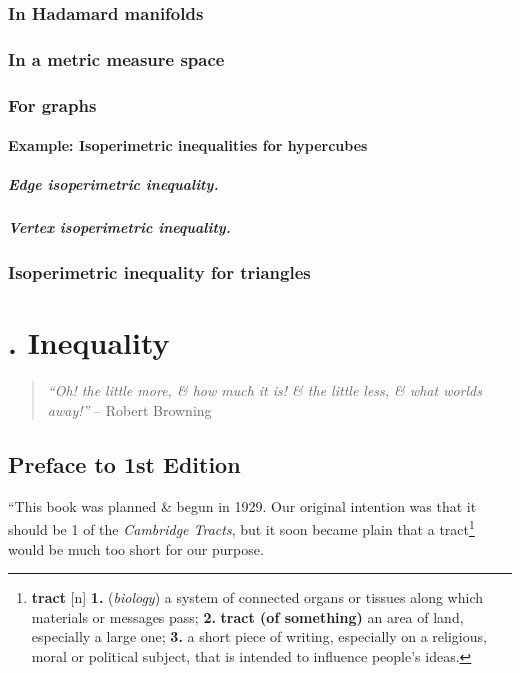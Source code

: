 \documentclass[oneside]{book}
\numberwithin{equation}{section}
\begin{document}
\subsection{In Hadamard manifolds}

\subsection{In a metric measure space}

\subsection{For graphs}

\subsubsection{Example: Isoperimetric inequalities for hypercubes}

\paragraph{Edge isoperimetric inequality.}

\paragraph{Vertex isoperimetric inequality.}

\subsection{Isoperimetric inequality for triangles}


\chapter{\cite{Hardy_Littlewood_Polya1952}. Inequality}

\begin{quotation}
	\textit{``Oh! the little more, \& how much it is! \& the little less, \& what worlds away!''} -- Robert Browning
\end{quotation}

\section*{Preface to 1st Edition}
``This book was planned \& begun in 1929. Our original intention was that it should be 1 of the \textit{Cambridge Tracts}, but it soon became plain that a tract\footnote{\textbf{tract} [n] \textbf{1.} (\textit{biology}) a system of connected organs or tissues along which materials or messages pass; \textbf{2.} \textbf{tract (of something)} an area of land, especially a large one; \textbf{3.} a short piece of writing, especially on a religious, moral or political subject, that is intended to influence people's ideas.} would be much too short for our purpose.
\end{document}
